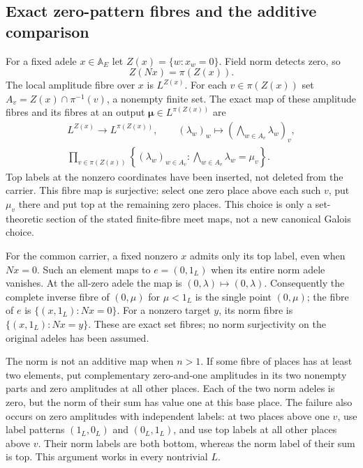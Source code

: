 \subsection{Exact zero-pattern fibres and the additive comparison}

For a fixed adele $x\in\mathbb A_E$ let $Z(x)=\{w:x_w=0\}$.
Field norm detects zero, so
\begin{equation}\tag{GTL8}
 Z(Nx)=\pi(Z(x)).
\end{equation}
The local amplitude fibre over $x$ is $L^{Z(x)}$.
For each $v\in\pi(Z(x))$ set
$A_v=Z(x)\cap\pi^{-1}(v)$, a nonempty finite set. The exact
map of these amplitude fibres and its fibres at an output
$\boldsymbol\mu\in L^{\pi(Z(x))}$ are
\begin{equation}\tag{GTL9}
 \begin{gathered}
 L^{Z(x)}\longrightarrow L^{\pi(Z(x))},\qquad
 (\lambda_w)_w\longmapsto
                 (\bigwedge_{w\in A_v}\lambda_w)_v,\\
 \prod_{v\in\pi(Z(x))}
 \left\{(\lambda_w)_{w\in A_v}:
                         \bigwedge_{w\in A_v}\lambda_w=\mu_v\right\}.
 \end{gathered}
\end{equation}
Top labels at the nonzero coordinates have been inserted, not
deleted from the carrier. This fibre map is surjective: select one
zero place above each such $v$, put $\mu_v$ there and put top at
the remaining zero places. This choice is only a set-theoretic
section of the stated finite-fibre meet maps, not a new canonical
Galois choice.

For the common carrier, a fixed nonzero $x$ admits only its top
label, even when $Nx=0$. Such an element maps to $e=(0,1_L)$
when its entire norm adele vanishes. At the all-zero adele the
map is $(0,\lambda)\mapsto(0,\lambda)$. Consequently the
complete inverse fibre of $(0,\mu)$ for $\mu<1_L$ is the
single point $(0,\mu)$; the fibre of $e$ is
$\{(x,1_L):Nx=0\}$. For a nonzero target $y$, its norm fibre
is $\{(x,1_L):Nx=y\}$. These are exact set fibres; no norm
surjectivity on the original adeles has been assumed.

The norm is not an additive map when $n>1$. If some fibre of
places has at least two elements, put complementary zero-and-one
amplitudes in its two nonempty parts and zero amplitudes at all
other places. Each of the two norm adeles is zero, but the norm
of their sum has value one at this base place. The failure also
occurs on zero amplitudes with independent labels: at two places
above one $v$, use label patterns $(1_L,0_L)$ and $(0_L,1_L)$,
and use top labels at all other places above $v$. Their norm
labels are both bottom, whereas the norm label of their sum is
top. This argument works in every nontrivial $L$.

